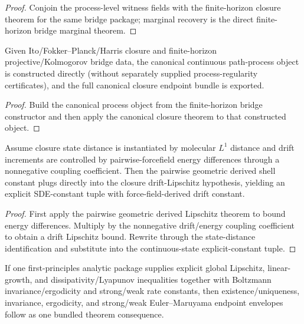 \begin{proof}
Conjoin the process-level witness fields with the finite-horizon closure theorem for the same bridge package; marginal recovery is the direct finite-horizon bridge marginal theorem.
\end{proof}

\begin{theorem}\label{thm:langevin-canonical-pathprocess-of-finite-horizon-bridge}
Given Ito/Fokker--Planck/Harris closure and finite-horizon projective/Kolmogorov bridge data, the canonical continuous path-process object is constructed directly (without separately supplied process-regularity certificates), and the full canonical closure endpoint bundle is exported.
\end{theorem}

\begin{proof}
Build the canonical process object from the finite-horizon bridge constructor and then apply the canonical closure theorem to that constructed object.
\end{proof}

\begin{theorem}\label{thm:langevin-forcefield-derived-lipschitz-injection}
Assume closure state distance is instantiated by molecular $L^1$ distance and drift increments are controlled by pairwise-forcefield energy differences through a nonnegative coupling coefficient. Then the pairwise geometric derived shell constant plugs directly into the closure drift-Lipschitz hypothesis, yielding an explicit SDE-constant tuple with force-field-derived drift constant.
\end{theorem}

\begin{proof}
First apply the pairwise geometric derived Lipschitz theorem to bound energy differences. Multiply by the nonnegative drift/energy coupling coefficient to obtain a drift Lipschitz bound. Rewrite through the state-distance identification and substitute into the continuous-state explicit-constant tuple.
\end{proof}

\begin{theorem}\label{thm:langevin-first-principles-discharge}
If one first-principles analytic package supplies explicit global Lipschitz, linear-growth, and dissipativity/Lyapunov inequalities together with Boltzmann invariance/ergodicity and strong/weak rate constants, then existence/uniqueness, invariance, ergodicity, and strong/weak Euler--Maruyama endpoint envelopes follow as one bundled theorem consequence.
\end{theorem}

